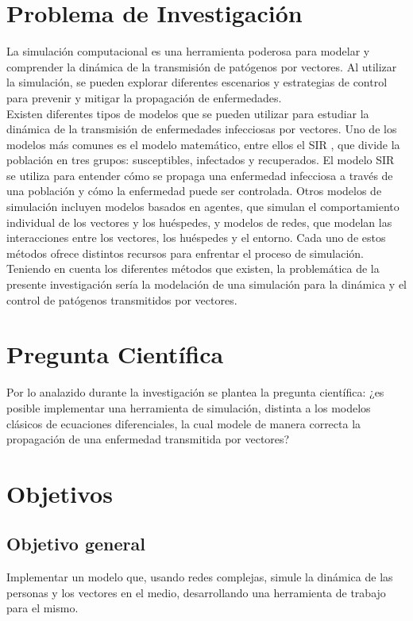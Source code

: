 \section{Problema de Investigación}
La simulación computacional es una herramienta poderosa para modelar y comprender
la dinámica de la transmisión de patógenos por vectores. Al utilizar la simulación,
se pueden explorar diferentes escenarios y estrategias de control para prevenir y mitigar 
la propagación de enfermedades.\autocite{Ferguson2006}\\
Existen diferentes tipos de modelos que se pueden utilizar para estudiar 
la dinámica de la transmisión de enfermedades infecciosas por vectores. Uno
de los modelos más comunes es el modelo matemático, entre ellos el SIR 
\autocite{Kermack1927}, que divide la población en tres grupos:
susceptibles, infectados y recuperados. El modelo SIR se utiliza para entender cómo
se propaga una enfermedad infecciosa a través de una población y cómo la enfermedad 
puede ser controlada. Otros modelos de simulación incluyen modelos basados en
agentes, que simulan el comportamiento individual de los vectores y los huéspedes, y
modelos de redes, que modelan las interacciones entre los vectores, los huéspedes y
el entorno. Cada uno de estos métodos ofrece distintos recursos para enfrentar el proceso de simulación.
\autocite{Ferguson2006} \autocite{Balcan2009}\\
Teniendo en cuenta los diferentes métodos que existen, la problemática de la presente
investigación sería la modelación de una simulación para la dinámica y el control de patógenos 
transmitidos por vectores.\\

\section{Pregunta Científica}
Por lo analazido durante la investigación se plantea la pregunta científica: ¿es posible implementar una
herramienta de simulación, distinta a los modelos clásicos de ecuaciones diferenciales, la cual modele 
de manera correcta la propagación de una enfermedad transmitida por vectores?


\section{Objetivos}
\subsection{Objetivo general}
Implementar un modelo que, usando redes complejas, simule la dinámica de las personas y los vectores en el medio, 
desarrollando una herramienta de trabajo para el mismo.


